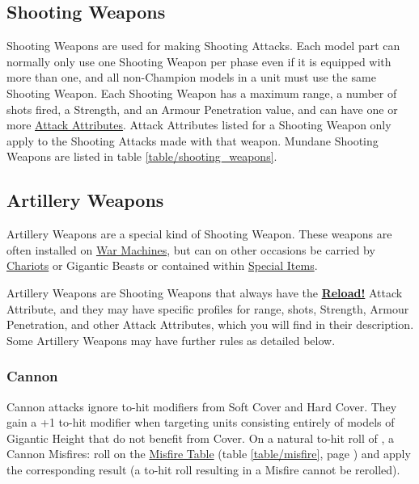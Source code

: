\columnbreak

\subsection{Shooting Weapons}
\idx[main=y]{\shootingweapons}\label{shooting_weapons}

Shooting Weapons are used for making Shooting Attacks. Each model part can normally only use one Shooting Weapon per phase even if it is equipped with more than one, and all non-Champion \rnf{} models in a unit must use the same Shooting Weapon. Each Shooting Weapon has a maximum range, a number of shots fired, a Strength, and an Armour Penetration value, and can have one or more \hyperref[attack_attributes]{Attack Attributes}. Attack Attributes listed for a Shooting Weapon only apply to the Shooting Attacks made with that weapon. Mundane Shooting Weapons are listed in table \ref{table/shooting_weapons}.

\subsection{Artillery Weapons}
\idx[main=y]{\artilleryweapons}\label{artillery_weapons}

Artillery Weapons are a special kind of Shooting Weapon. These weapons are often installed on \hyperref[war_machine]{War Machines}, but can on other occasions be carried by \hyperref[chariot]{Chariots} or Gigantic Beasts or contained within \hyperref[special_items]{Special Items}.

Artillery Weapons are Shooting Weapons that always have the \hyperref[reload]{\textbf{Reload!}} Attack Attribute, and they may have specific profiles for range, shots, Strength, Armour Penetration, and other Attack Attributes, which you will find in their description. Some Artillery Weapons may have further rules as detailed below.

\subsubsection{Cannon}
\idx[main=y]{\cannon}\label{cannon}

Cannon attacks ignore to-hit modifiers from Soft Cover and Hard Cover. They gain a +1 to-hit modifier when targeting units consisting entirely of models of Gigantic Height that do not benefit from Cover. On a natural to-hit roll of , a Cannon Misfires: roll on the \hyperref[the_misfire_table]{Misfire Table} (table \ref{table/misfire}, page \pageref{table/misfire}) and apply the corresponding result (a to-hit roll resulting in a Misfire cannot be rerolled).

